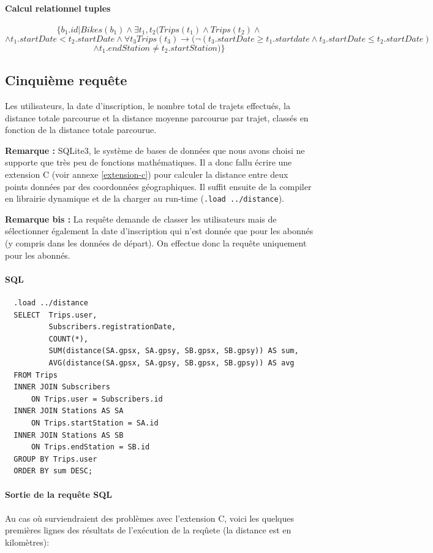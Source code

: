\documentclass[a4paper]{article}
\begin{document}
    \paragraph{Calcul relationnel tuples}
    $$ \{ b_1.id | Bikes(b_1) \land \exists t_1, t_2 (Trips(t_1) \land Trips(t_2) \land $$
    $$ \land t_1.startDate < t_2.startDate \land \forall t_3 Trips(t_3) \rightarrow (\lnot (t_3.startDate \geq t_1.startdate \land t_3.startDate \leq t_2.startDate)$$
    $$ \land t_1.endStation \neq t_2.startStation)\}$$

\subsection{Cinquième requête}
	Les utilisateurs, la date d'inscription, le nombre total de trajets effectués, la distance totale parcourue et la distance moyenne parcourue par trajet, classés en fonction de la distance totale parcourue.
    
	\textbf{Remarque :} SQLite3, le système de bases de données que nous avons choisi ne supporte que très peu de fonctions mathématiques. Il a donc fallu écrire une extension C (voir annexe \ref{extension-c}) pour calculer la distance entre deux points données par des coordonnées géographiques. Il suffit ensuite de la compiler en librairie dynamique et de la charger au run-time (\texttt{.load ../distance}).
    
    \textbf{Remarque bis :} La requête demande de classer les utilisateurs mais de sélectionner également la date d'inscription qui n'est donnée que pour les abonnés (y compris dans les données de départ). On effectue donc la requête uniquement pour les abonnés.

	\paragraph{SQL}
  \begin{verbatim}
  .load ../distance
  SELECT  Trips.user, 
          Subscribers.registrationDate, 
          COUNT(*), 
          SUM(distance(SA.gpsx, SA.gpsy, SB.gpsx, SB.gpsy)) AS sum,
          AVG(distance(SA.gpsx, SA.gpsy, SB.gpsx, SB.gpsy)) AS avg
  FROM Trips
  INNER JOIN Subscribers
      ON Trips.user = Subscribers.id
  INNER JOIN Stations AS SA
      ON Trips.startStation = SA.id
  INNER JOIN Stations AS SB
      ON Trips.endStation = SB.id
  GROUP BY Trips.user
  ORDER BY sum DESC;
  \end{verbatim}
  
  \paragraph{Sortie de la requête SQL} Au cas où surviendraient des problèmes avec l'extension C, voici les quelques premières lignes des résultats de l'exécution de la reqûete (la distance est en kilomètres):
    
\end{document}

